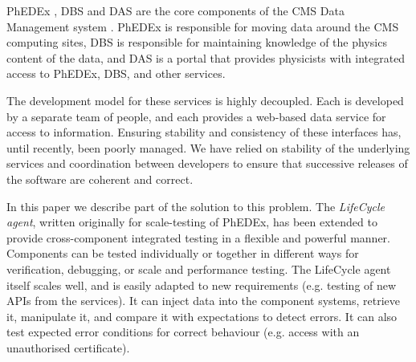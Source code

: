 PhEDEx \cite{PhEDEx}, DBS \cite{DBS} and DAS \cite{DAS} are the core components of the CMS Data 
Management system \cite{CMSDMS}. PhEDEx is responsible for moving data around the CMS computing 
sites, DBS is responsible for maintaining knowledge of the physics content of the data, and DAS is 
a portal that provides physicists with integrated access to PhEDEx, DBS, and other services.

The development model for these services is highly decoupled. Each is developed by a separate team 
of people, and each provides a web-based data service for access to information. Ensuring 
stability and consistency of these interfaces has, until recently, been poorly managed. We have 
relied on stability of the underlying services and coordination between developers to ensure that 
successive releases of the software are coherent and correct.

In this paper we describe part of the solution to this problem. The {\it LifeCycle agent}, written 
originally for scale-testing of PhEDEx, has been extended to provide cross-component integrated 
testing in a flexible and powerful manner. Components can be tested individually or together in 
different ways for verification, debugging, or scale and performance testing. The LifeCycle agent 
itself scales well, and is easily adapted to new requirements (e.g. testing of new APIs from the 
services). It can inject data into the component systems, retrieve it, manipulate it, and compare 
it with expectations to detect errors. It can also test expected error conditions for correct 
behaviour (e.g. access with an unauthorised certificate).
